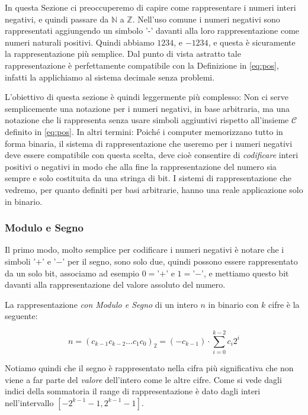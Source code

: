 In questa Sezione ci preoccuperemo di capire come rappresentare i numeri interi negativi, e quindi passare da $\mathbb{N}$ a $\mathbb{Z}$. Nell'uso comune i numeri negativi sono rappresentati aggiungendo un simbolo '-' davanti alla loro rappresentazione come numeri naturali positivi. Quindi abbiamo $1234$, e $-1234$, e questa è sicuramente la rappresentazione più semplice. Dal punto di vista astratto tale rappresentazione è perfettamente compatibile con la Definizione in \eqref{eq:pos}, infatti la applichiamo al sistema decimale senza problemi.

L'obiettivo di questa sezione è quindi leggermente più complesso: Non ci serve semplicemente una notazione per i numeri negativi, in base arbitraria, ma una notazione che li rappresenta senza usare simboli aggiuntivi rispetto all'insieme $\mathcal{C}$ definito in \eqref{eq:pos}. In altri termini: Poiché i computer memorizzano tutto in forma binaria, il sistema di rappresentazione che useremo per i numeri negativi deve essere compatibile con questa scelta, deve cioè consentire di \emph{codificare} interi positivi o negativi in modo che alla fine la rappresentazione del numero sia sempre e solo costituita da una stringa di bit. I sistemi di rappresentazione che vedremo, per quanto
definiti per basi arbitrarie, hanno una reale applicazione solo in binario.

\subsubsection{Modulo e Segno}

Il primo modo, molto semplice per codificare i numeri negativi è notare che i
simboli '$+$' e '$-$' per il segno, sono solo due, quindi possono essere
rappresentato da un solo bit, associamo ad esempio $0 = $'$+$' e $1 = $'$-$', e
mettiamo questo bit davanti alla rappresentazione del valore assoluto del
numero.

\begin{defn} La rappresentazione \emph{con Modulo e
Segno} di un intero $n$ in binario con $k$ cifre è la seguente:
	
\[ n = (c_{k-1}c_{k-2}{\ldots}c_1c_0)_2 = (-c_{k-1}) \cdot \sum_{i=0}^{k-2}c_i2^i \]
\end{defn}

Notiamo quindi che il segno è rappresentato nella cifra più significativa che  non viene a far parte del \emph{valore} dell'intero come le altre cifre. Come si vede dagli indici della sommatoria il range di rappresentazione è dato dagli interi nell'intervallo $[-2^{k-1}-1,2^{k-1}-1]$.

